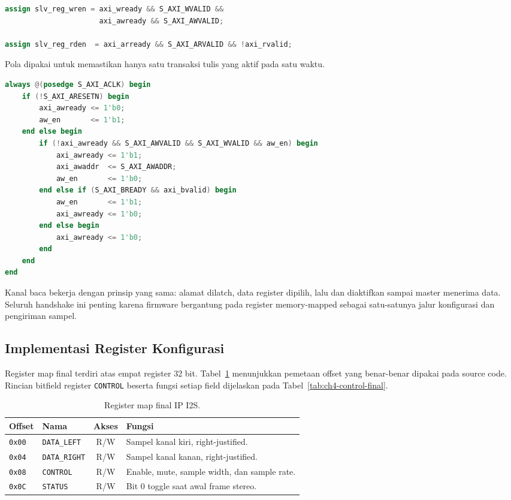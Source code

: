 \begin{lstlisting}[language=Verilog,caption={Strobe tulis dan baca pada AXI4-Lite.},label={lst:ch4-axi-strobe}]
assign slv_reg_wren = axi_wready && S_AXI_WVALID &&
                      axi_awready && S_AXI_AWVALID;

assign slv_reg_rden  = axi_arready && S_AXI_ARVALID && !axi_rvalid;
\end{lstlisting}

Pola  dipakai untuk memastikan hanya satu transaksi tulis yang aktif pada satu waktu.

\begin{lstlisting}[language=Verilog,caption={Handshake tulis menggunakan token \texttt{aw\_en}.},label={lst:ch4-aw-en}]
always @(posedge S_AXI_ACLK) begin
    if (!S_AXI_ARESETN) begin
        axi_awready <= 1'b0;
        aw_en       <= 1'b1;
    end else begin
        if (!axi_awready && S_AXI_AWVALID && S_AXI_WVALID && aw_en) begin
            axi_awready <= 1'b1;
            axi_awaddr  <= S_AXI_AWADDR;
            aw_en       <= 1'b0;
        end else if (S_AXI_BREADY && axi_bvalid) begin
            aw_en       <= 1'b1;
            axi_awready <= 1'b0;
        end else begin
            axi_awready <= 1'b0;
        end
    end
end
\end{lstlisting}

Kanal baca bekerja dengan prinsip yang sama: alamat dilatch, data register dipilih, lalu  dan  diaktifkan sampai master menerima data. Seluruh handshake ini penting karena firmware bergantung pada register memory-mapped sebagai satu-satunya jalur konfigurasi dan pengiriman sampel.

\subsection{Implementasi Register Konfigurasi}

Register map final terdiri atas empat register 32 bit. Tabel~\ref{tab:ch4-regmap-final} menunjukkan pemetaan offset yang benar-benar dipakai pada source code. Rincian bitfield register \texttt{CONTROL} beserta fungsi setiap field dijelaskan pada Tabel~\ref{tab:ch4-control-final}.

\begin{table}[htbp]
\centering
\caption{Register map final IP I2S.}
\label{tab:ch4-regmap-final}
\begin{tabular}{|l|l|c|p{7.5cm}|}
\hline
\textbf{Offset} & \textbf{Nama} & \textbf{Akses} & \textbf{Fungsi} \\
\hline
\texttt{0x00} & \texttt{DATA\_LEFT} & R/W & Sampel kanal kiri, right-justified. \\
\texttt{0x04} & \texttt{DATA\_RIGHT} & R/W & Sampel kanal kanan, right-justified. \\
\texttt{0x08} & \texttt{CONTROL} & R/W & Enable, mute, sample width, dan sample rate. \\
\texttt{0x0C} & \texttt{STATUS} & R/W & Bit 0 toggle saat awal frame stereo. \\
\hline
\end{tabular}
\end{table}

